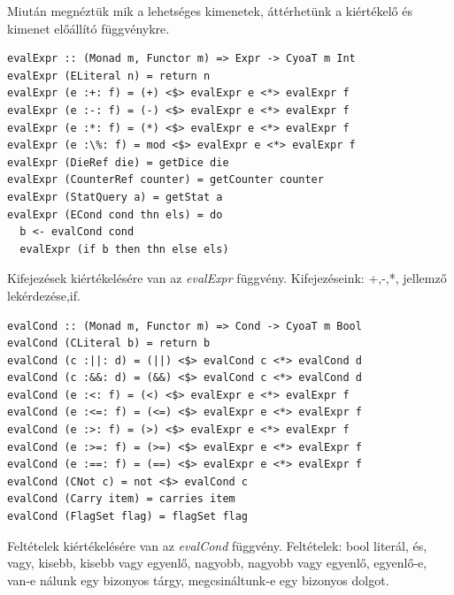 \documentclass[12pt,a4paper,oneside]{report}
\begin{document}
      Miután megnéztük mik a lehetséges kimenetek, áttérhetünk a
      kiértékelő és kimenet előállító függvénykre.
      \begin{verbatim}
evalExpr :: (Monad m, Functor m) => Expr -> CyoaT m Int
evalExpr (ELiteral n) = return n
evalExpr (e :+: f) = (+) <$> evalExpr e <*> evalExpr f
evalExpr (e :-: f) = (-) <$> evalExpr e <*> evalExpr f
evalExpr (e :*: f) = (*) <$> evalExpr e <*> evalExpr f
evalExpr (e :\%: f) = mod <$> evalExpr e <*> evalExpr f
evalExpr (DieRef die) = getDice die
evalExpr (CounterRef counter) = getCounter counter
evalExpr (StatQuery a) = getStat a
evalExpr (ECond cond thn els) = do
  b <- evalCond cond
  evalExpr (if b then thn else els)
      \end{verbatim}
      Kifejezések kiértékelésére van az \emph{evalExpr}
      függvény. Kifejezéseink: +,-,*,%
      jellemző lekérdezése,if.

  \begin{verbatim}
evalCond :: (Monad m, Functor m) => Cond -> CyoaT m Bool
evalCond (CLiteral b) = return b
evalCond (c :||: d) = (||) <$> evalCond c <*> evalCond d
evalCond (c :&&: d) = (&&) <$> evalCond c <*> evalCond d
evalCond (e :<: f) = (<) <$> evalExpr e <*> evalExpr f
evalCond (e :<=: f) = (<=) <$> evalExpr e <*> evalExpr f
evalCond (e :>: f) = (>) <$> evalExpr e <*> evalExpr f
evalCond (e :>=: f) = (>=) <$> evalExpr e <*> evalExpr f
evalCond (e :==: f) = (==) <$> evalExpr e <*> evalExpr f
evalCond (CNot c) = not <$> evalCond c
evalCond (Carry item) = carries item
evalCond (FlagSet flag) = flagSet flag
  \end{verbatim}
  Feltételek kiértékelésére van az \emph{evalCond} függvény. Feltételek: bool
  literál, és, vagy, kisebb, kisebb vagy egyenlő, nagyobb, nagyobb
  vagy egyenlő, egyenlő-e, van-e nálunk egy bizonyos tárgy,
  megcsináltunk-e egy bizonyos dolgot.
\end{document}
